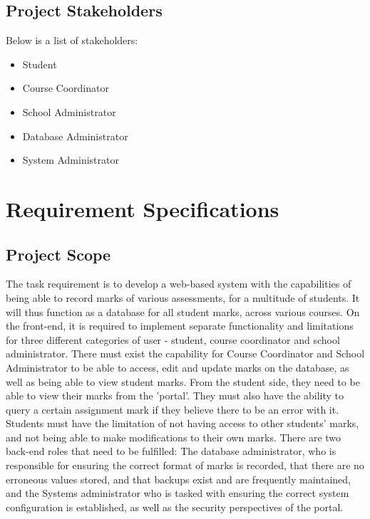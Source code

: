 \documentclass[paper=a4, fontsize=11pt]{scrartcl}
\numberwithin{equation}{section}		%
\numberwithin{figure}{section}			%
\numberwithin{table}{section}				%
\begin{document}
\subsection{Project Stakeholders}
Below is a list of stakeholders:

\begin{itemize}
\item Student
\item Course Coordinator
\item School Administrator
\item Database Administrator
\item System Administrator
\end{itemize}



\section{Requirement Specifications}

\subsection{Project Scope}
The task requirement is to develop a web-based system with the capabilities of being able to
record marks of various assessments, for a multitude of students. It will thus function as a
database for all student marks, across various courses. On the front-end, it is required to
implement separate functionality and limitations for three different categories of user -
student, course coordinator and school administrator. There must exist the capability for
Course Coordinator and School Administrator to be able to access, edit and update marks
on the database, as well as being able to view student marks. From the student side, they
need to be able to view their marks from the 'portal'. They must also have the ability to query
a certain assignment mark if they believe there to be an error with it. Students must have the
limitation of not having access to other students' marks, and not being able to make
modifications to their own marks.
There are two back-end roles that need to be fulfilled: The database administrator, who is
responsible for ensuring the correct format of marks is recorded, that there are no erroneous
values stored, and that backups exist and are frequently maintained, and the Systems
administrator who is tasked with ensuring the correct system configuration is established, as
well as the security perspectives of the portal.
\end{document}
